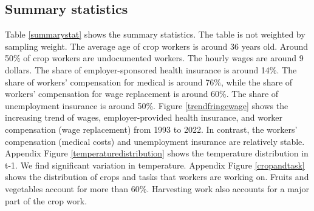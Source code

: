 \documentclass[12pt]{article}
\begin{document}
\subsection{Summary statistics}
Table \ref{summarystat} shows the summary statistics. The table is not weighted by sampling weight. The average age of crop workers is around 36 years old. Around 50\% of crop workers are undocumented workers. The hourly wages are around 9 dollars. The share of employer-sponsored health insurance is around 14\%. The share of workers' compensation for medical is around 76\%, while the share of workers' compensation for wage replacement is around 60\%. The share of unemployment insurance is around 50\%. Figure \ref{trendfringewage} shows the increasing trend of wages, employer-provided health insurance, and worker compensation (wage replacement) from 1993 to 2022. In contrast, the workers' compensation (medical costs) and unemployment insurance are relatively stable. Appendix Figure \ref{temperaturedistribution} shows the temperature distribution in t-1. We find significant variation in temperature.  Appendix Figure \ref{cropandtask} shows the distribution of crops and tasks that workers are working on. Fruits and vegetables account for more than 60\%. Harvesting work also accounts for a major part of the crop work. 
\end{document}
